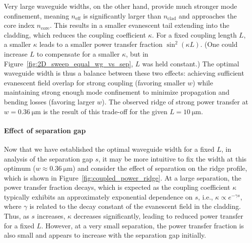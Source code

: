 \documentclass[10pt, a4paper]{article}
\begin{document}
Very large waveguide widths, on the other hand, provide much stronger mode confinement, meaning \(n_\text{eff}\) is significantly larger than \(n_\text{clad}\) and approaches the core index \(n_\text{core}\).
This results in a smaller evanescent tail extending into the cladding, which reduces the coupling coefficient \(\kappa\). For a fixed coupling length \(L\), a smaller \(\kappa\) leads to a smaller power transfer fraction \(\sin^2(\kappa L)\).
(One could increase \(L\) to compensate for a smaller \(\kappa\), but in Figure~\ref{fig:2D_sweep_equal_wg_vs_sep}, \(L\) was held constant.)
The optimal waveguide width is thus a balance between these two effects: achieving sufficient evanescent field overlap for strong coupling (favoring smaller \(w\)) while maintaining strong enough mode confinement to minimize propagation and bending losses (favoring larger \(w\)).
The observed ridge of strong power transfer at \(w=\SI{0.36}{\um}\) is the result of this trade-off for the given \(L=\SI{10}{\um}\).

\paragraph{Effect of separation gap}

Now that we have established the optimal waveguide width for a fixed \(L\),
in analysis of the separation gap \(s\), it may be more intuitive to fix the width at this optimum (\(w \approx \SI{0.36}{\um}\)) and consider the effect of separation on the ridge profile,
which is shown in Figure~\ref{fig:coupled_power_ridge}.
At a large separation, the power transfer fraction decays, which is expected as the coupling coefficient \(\kappa\) typically exhibits an approximately exponential dependence on \(s\), i.e., \(\kappa \propto e^{-\gamma s}\), where \(\gamma\) is related to the decay constant of the evanescent field in the cladding\autocite{dolph5CharacteristicsEvanescent2025}. Thus, as \(s\) increases, \(\kappa\) decreases significantly, leading to reduced power transfer for a fixed \(L\).
However, at a very small separation, the power transfer fraction is also small and appears to increase with the separation gap initially.

\end{document}
